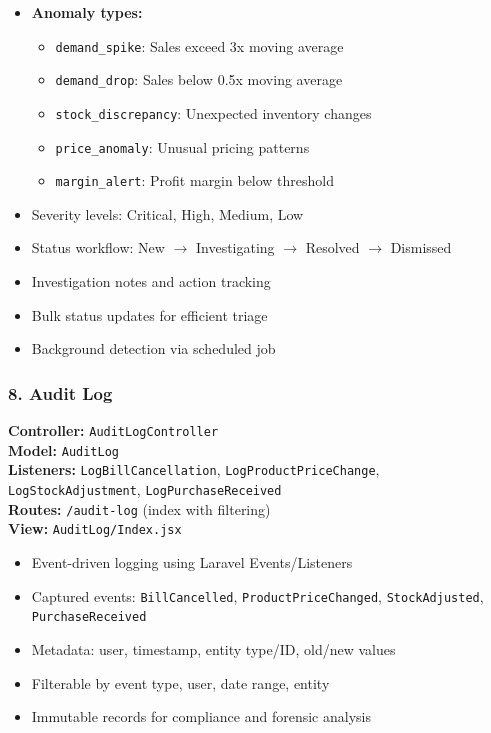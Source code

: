 \begin{itemize}
    \item \textbf{Anomaly types:}
    \begin{itemize}
        \item \texttt{demand\_spike}: Sales exceed 3x moving average
        \item \texttt{demand\_drop}: Sales below 0.5x moving average
        \item \texttt{stock\_discrepancy}: Unexpected inventory changes
        \item \texttt{price\_anomaly}: Unusual pricing patterns
        \item \texttt{margin\_alert}: Profit margin below threshold
    \end{itemize}
    \item Severity levels: Critical, High, Medium, Low
    \item Status workflow: New $\rightarrow$ Investigating $\rightarrow$ Resolved $\rightarrow$ Dismissed
    \item Investigation notes and action tracking
    \item Bulk status updates for efficient triage
    \item Background detection via scheduled job
\end{itemize}

\subsubsection{8. Audit Log}

\textbf{Controller:} \texttt{AuditLogController}\\
\textbf{Model:} \texttt{AuditLog}\\
\textbf{Listeners:} \texttt{LogBillCancellation}, \texttt{LogProductPriceChange}, \texttt{LogStockAdjustment}, \texttt{LogPurchaseReceived}\\
\textbf{Routes:} \texttt{/audit-log} (index with filtering)\\
\textbf{View:} \texttt{AuditLog/Index.jsx}

\begin{itemize}
    \item Event-driven logging using Laravel Events/Listeners
    \item Captured events: \texttt{BillCancelled}, \texttt{ProductPriceChanged}, \texttt{StockAdjusted}, \texttt{PurchaseReceived}
    \item Metadata: user, timestamp, entity type/ID, old/new values
    \item Filterable by event type, user, date range, entity
    \item Immutable records for compliance and forensic analysis
\end{itemize}

